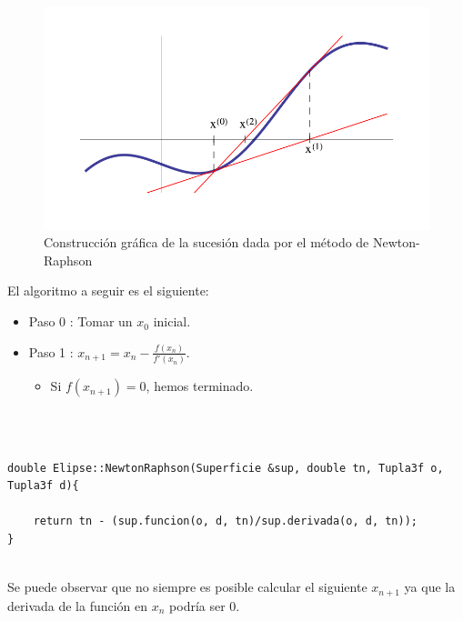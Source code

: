 \begin{figure}[h]
	\begin{center}
		\includegraphics[width=1.0\textwidth]{imagenes/newton.png}
	\end{center}
	\caption{Construcción gráfica de la sucesión dada por el método de Newton-Raphson}
	\label{fig:etiq_7}
\end{figure}

El algoritmo a seguir es el siguiente:

\begin{itemize}
	\item Paso 0 : Tomar un $x_0$ inicial.
	\item Paso 1 : $x_{n+1} = x_n - \frac{f(x_n)}{f'(x_n)}$.
	\begin{itemize}
		\item Si $f(x_{n+1}) = 0$, hemos terminado.
	\end{itemize}
\end{itemize}
${ }$\\

\begin{lstlisting}[style=Consola]

double Elipse::NewtonRaphson(Superficie &sup, double tn, Tupla3f o, Tupla3f d){

	return tn - (sup.funcion(o, d, tn)/sup.derivada(o, d, tn));
}

\end{lstlisting}
${ }$\\



Se puede observar que no siempre es posible calcular el siguiente $x_{n+1}$ ya que la derivada de la función en $x_{n}$ podría ser $0$.
${ }$\\
${ }$\\

